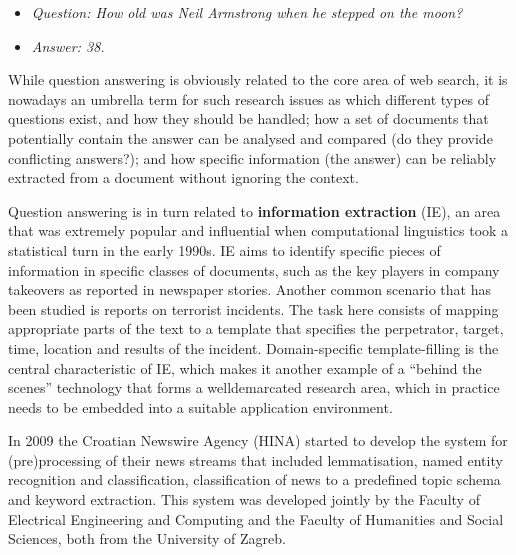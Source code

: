 \begin{multicols}{2}
\begin{itemize}
\item[] \textit{Question: How old was Neil Armstrong when he stepped on the moon?}
\item[] \textit{Answer: 38.}
\end{itemize}

While question answering is obviously related to the core area of web search, it is nowadays an umbrella term for such research issues as which different types of questions exist, and how they should be handled; how a set of documents that potentially contain the answer can be analysed and compared (do they provide conflicting answers?); and how specific information (the answer) can be reliably extracted from a document without ignoring the context. 


Question answering is in turn related to \textbf{information extraction} (IE), an area that was extremely popular and influential when computational linguistics took a statistical turn in the early 1990s. IE aims to identify specific pieces of information in specific classes of documents, such as the key players in company takeovers as reported in newspaper stories. Another common scenario that has been studied is reports on terrorist incidents. The task here consists of mapping appropriate parts of the text to a template that specifies the perpetrator, target, time, location and results of the incident. Domain-specific template-filling is the central characteristic of IE, which makes it another example of a “behind the scenes” technology that forms a welldemarcated research area, which in practice needs to be embedded into a suitable application environment.

In 2009 the Croatian Newswire Agency (HINA) \cite{str25} started to develop the system for (pre)processing of their news streams that included lemmatisation, named entity recognition \cite{pro7} and classification, classification of news to a predefined topic schema and keyword extraction. This system was developed jointly by the Faculty of Electrical Engineering and Computing \cite{str26} and the Faculty of Humanities and Social Sciences, both from the University of Zagreb.


\end{multicols}
